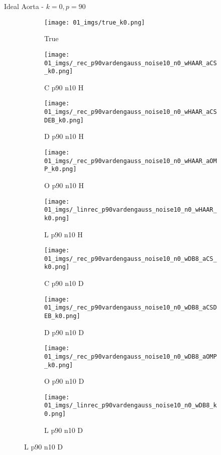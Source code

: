 \begin{frame}{Ideal Aorta - $k=0,p=90$}{}
\begin{figure}
\begin{subfigure}{0.1\textwidth}
\texttt{[image: 01\_imgs/true\_k0.png]}
\caption*{\Tiny True}
\end{subfigure}
\begin{subfigure}{0.1\textwidth}
\texttt{[image: 01\_imgs/\_rec\_p90vardengauss\_noise10\_n0\_wHAAR\_aCS\_k0.png]}
\caption*{\Tiny C p90 n10 H}
\end{subfigure}
\begin{subfigure}{0.1\textwidth}
\texttt{[image: 01\_imgs/\_rec\_p90vardengauss\_noise10\_n0\_wHAAR\_aCSDEB\_k0.png]}
\caption*{\Tiny D p90 n10 H}
\end{subfigure}
\begin{subfigure}{0.1\textwidth}
\texttt{[image: 01\_imgs/\_rec\_p90vardengauss\_noise10\_n0\_wHAAR\_aOMP\_k0.png]}
\caption*{\Tiny O p90 n10 H}
\end{subfigure}
\begin{subfigure}{0.1\textwidth}
\texttt{[image: 01\_imgs/\_linrec\_p90vardengauss\_noise10\_n0\_wHAAR\_k0.png]}
\caption*{\Tiny L p90 n10 H}
\end{subfigure}
\begin{subfigure}{0.1\textwidth}
\texttt{[image: 01\_imgs/\_rec\_p90vardengauss\_noise10\_n0\_wDB8\_aCS\_k0.png]}
\caption*{\Tiny C p90 n10 D}
\end{subfigure}
\begin{subfigure}{0.1\textwidth}
\texttt{[image: 01\_imgs/\_rec\_p90vardengauss\_noise10\_n0\_wDB8\_aCSDEB\_k0.png]}
\caption*{\Tiny D p90 n10 D}
\end{subfigure}
\begin{subfigure}{0.1\textwidth}
\texttt{[image: 01\_imgs/\_rec\_p90vardengauss\_noise10\_n0\_wDB8\_aOMP\_k0.png]}
\caption*{\Tiny O p90 n10 D}
\end{subfigure}
\begin{subfigure}{0.1\textwidth}
\texttt{[image: 01\_imgs/\_linrec\_p90vardengauss\_noise10\_n0\_wDB8\_k0.png]}
\caption*{\Tiny L p90 n10 D}
\end{subfigure}
\vspace{5pt}


\end{figure}
\end{frame}
